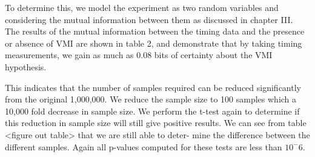 To determine this, we model the experiment as two random variables and considering the mutual information between them as discussed in chapter III. The results of the mutual information between the timing data and the presence or absence of VMI are shown in table 2, and demonstrate that by taking timing measurements, we gain as much as 0.08 bits of certainty about the VMI hypothesis. 


This indicates that the number of samples required can be reduced significantly from the original 1,000,000. We reduce the sample size to 100 samples which a 10,000 fold decrease in sample size. We perform the t-test again to determine if this reduction in sample size will still give positive results.  We can see from table <figure out table> that we are still able to deter- mine the difference between the different samples. Again all p-values computed for these tests are less than $10^−6$. 



